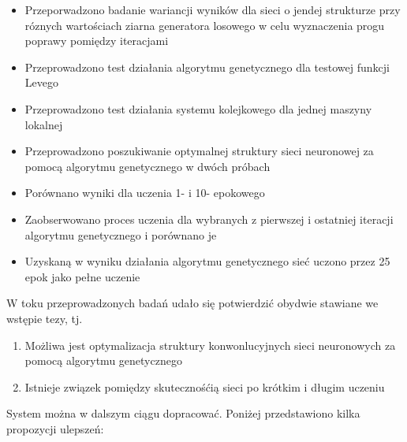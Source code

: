 \begin{itemize}
  \item Przeporwadzono badanie wariancji wyników dla sieci o jendej strukturze przy róznych wartościach ziarna generatora losowego w celu wyznaczenia progu poprawy pomiędzy iteracjami
  \item Przeprowadzono test działania algorytmu genetycznego dla testowej funkcji Levego
  \item Przeprowadzono test działania systemu kolejkowego dla jednej maszyny lokalnej
  \item Przeprowadzono poszukiwanie optymalnej struktury sieci neuronowej za pomocą algorytmu genetycznego w dwóch próbach
  \item Porównano wyniki dla uczenia 1- i 10- epokowego
  \item Zaobserwowano proces uczenia dla wybranych z pierwszej i ostatniej iteracji algorytmu genetycznego i porównano je
  \item Uzyskaną w wyniku działania algorytmu genetycznego sieć uczono przez 25 epok jako pełne uczenie
\end{itemize}

W toku przeprowadzonych badań udało się potwierdzić obydwie stawiane we wstępie tezy, tj.

\begin{enumerate}
  \item Możliwa jest optymalizacja struktury konwonlucyjnych sieci neuronowych za pomocą algorytmu genetycznego
  \item Istnieje związek pomiędzy skutecznośćią sieci po krótkim i długim uczeniu
\end{enumerate}

System można w dalszym ciągu dopracować.
Poniżej przedstawiono kilka propozycji ulepszeń:

